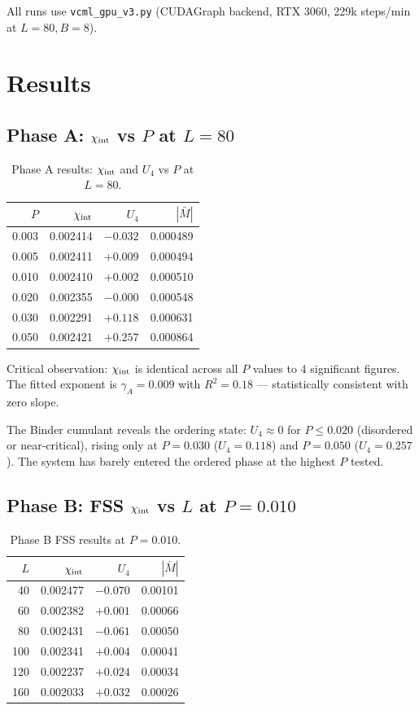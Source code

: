 \documentclass[11pt,a4paper]{article}
\begin{document}
All runs use \texttt{vcml\_gpu\_v3.py} (CUDAGraph backend, RTX 3060, 229k steps/min at $L=80,B=8$).

\section{Results}

\subsection{Phase A: $\chi_{\rm int}$ vs $P$ at $L=80$}

\begin{table}[h!]
\centering
\caption{Phase A results: $\chi_{\rm int}$ and $U_4$ vs $P$ at $L=80$.}
\begin{tabular}{rrrr}
\toprule
$P$ & $\chi_{\rm int}$ & $U_4$ & $|\bar{M}|$ \\
\midrule
0.003 & 0.002414 & $-0.032$ & 0.000489 \\
0.005 & 0.002411 & $+0.009$ & 0.000494 \\
0.010 & 0.002410 & $+0.002$ & 0.000510 \\
0.020 & 0.002355 & $-0.000$ & 0.000548 \\
0.030 & 0.002291 & $+0.118$ & 0.000631 \\
0.050 & 0.002421 & $+0.257$ & 0.000864 \\
\bottomrule
\end{tabular}
\end{table}

Critical observation: $\chi_{\rm int}$ is identical across all $P$ values to 4 significant
figures.  The fitted exponent is $\gamma_A = 0.009$ with $R^2 = 0.18$ --- statistically
consistent with zero slope.

The Binder cumulant reveals the ordering state: $U_4 \approx 0$ for $P \leq 0.020$
(disordered or near-critical), rising only at $P = 0.030$ ($U_4 = 0.118$) and
$P = 0.050$ ($U_4 = 0.257$).  The system has barely entered the ordered phase
at the highest $P$ tested.

\subsection{Phase B: FSS $\chi_{\rm int}$ vs $L$ at $P=0.010$}

\begin{table}[h!]
\centering
\caption{Phase B FSS results at $P=0.010$.}
\begin{tabular}{rrrr}
\toprule
$L$ & $\chi_{\rm int}$ & $U_4$ & $|\bar{M}|$ \\
\midrule
 40 & 0.002477 & $-0.070$ & 0.00101 \\
 60 & 0.002382 & $+0.001$ & 0.00066 \\
 80 & 0.002431 & $-0.061$ & 0.00050 \\
100 & 0.002341 & $+0.004$ & 0.00041 \\
120 & 0.002237 & $+0.024$ & 0.00034 \\
160 & 0.002033 & $+0.032$ & 0.00026 \\
\bottomrule
\end{tabular}
\end{table}
\end{document}
